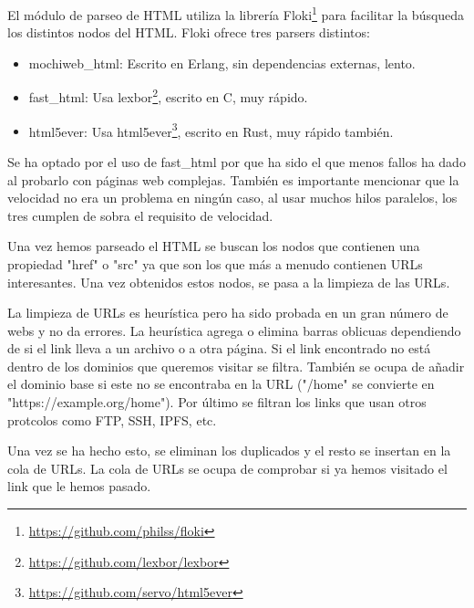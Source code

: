 El módulo de parseo de HTML utiliza la librería Floki\footnote{\url{https://github.com/philss/floki}} para facilitar la búsqueda los distintos nodos del HTML. Floki ofrece tres parsers distintos:

\begin{itemize}
  \item mochiweb\_html: Escrito en Erlang, sin dependencias externas, lento.
  \item fast\_html: Usa lexbor\footnote{\url{https://github.com/lexbor/lexbor}}, escrito en C, muy rápido.
  \item html5ever: Usa html5ever\footnote{\url{https://github.com/servo/html5ever}}, escrito en Rust, muy rápido también.
\end{itemize}

Se ha optado por el uso de fast\_html por que ha sido el que menos fallos ha dado al probarlo con páginas web complejas. También es importante mencionar que la velocidad no era un problema en ningún caso, al usar muchos hilos paralelos, los tres cumplen de sobra el requisito de velocidad.

Una vez hemos parseado el HTML se buscan los nodos que contienen una propiedad "href" o "src" ya que son los que más a menudo contienen URLs interesantes. Una vez obtenidos estos nodos, se pasa a la limpieza de las URLs.

La limpieza de URLs es heurística pero ha sido probada en un gran número de webs y no da errores. La heurística agrega o elimina barras oblicuas dependiendo de si el link lleva a un archivo o a otra página. Si el link encontrado no está dentro de los dominios que queremos visitar se filtra. También se ocupa de añadir el dominio base si este no se encontraba en la URL ("/home" se convierte en "https://example.org/home"). Por último se filtran los links que usan otros protcolos como FTP, SSH, IPFS, etc.

Una vez se ha hecho esto, se eliminan los duplicados y el resto se insertan en la cola de URLs. La cola de URLs se ocupa de comprobar si ya hemos visitado el link que le hemos pasado.